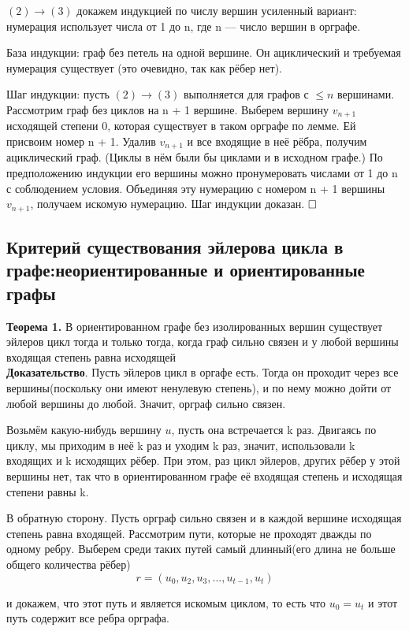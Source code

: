 \documentclass[a4paper, 10pt]{article}
\begin{document}
$(2) \to (3)$ докажем индукцией по числу вершин усиленный вариант: нумерация использует числа от 1 до n, где n — число вершин в орграфе.

База индукции: граф без петель на одной вершине. Он ациклический и требуемая нумерация существует (это очевидно, так как рёбер нет).

Шаг индукции: пусть $(2) \to (3)$ выполняется для графов с $\leqslant n$ вершинами. Рассмотрим граф без циклов на n + 1 вершине. Выберем вершину $v_{n+1}$ исходящей степени 0, которая существует в таком орграфе по лемме. Ей присвоим номер n + 1. Удалив $v_{n+1}$ и все входящие в неё рёбра, получим ациклический граф. (Циклы в нём были бы циклами и в исходном графе.) По предположению индукции его вершины можно пронумеровать числами от 1 до n с соблюдением условия. Объединяя эту нумерацию с номером n + 1 вершины $v_{n+1}$, получаем искомую нумерацию. Шаг индукции доказан. $\hfill \square$


\subsection{Критерий существования эйлерова цикла в графе:неориентированные и ориентированные графы}

\textbf{Теорема 1.} В ориентированном графе без изолированных вершин существует эйлеров цикл тогда и только тогда, когда граф сильно связен и у любой вершины входящая степень равна исходящей \\

\textbf{Доказательство}. Пусть эйлеров цикл в оргафе есть. Тогда он проходит через все вершины(поскольку они имеют ненулевую степень), и по нему можно дойти от любой вершины до любой. Значит, орграф сильно связен.

Возьмём какую-нибудь вершину $u$, пусть она встречается k раз. Двигаясь по циклу, мы приходим в неё k раз и уходим k раз, значит, использовали k входящих и k исходящих рёбер. При этом, раз цикл эйлеров, других рёбер у этой вершины нет, так что в ориентированном графе её входящая степень и исходящая степени равны k.

В обратную сторону. Пусть орграф сильно связен и в каждой вершине исходящая степень равна входящей. Рассмотрим пути, которые не проходят дважды по одному ребру. Выберем среди таких путей самый длинный(его длина не больше общего количества рёбер)\\

$$r = (u_0, u_2, u_3, ..., u_{t-1}, u_t)$$

и докажем, что этот путь и является искомым циклом, то есть что $u_0 = u_t$ и этот путь содержит все ребра орграфа.
\end{document}
